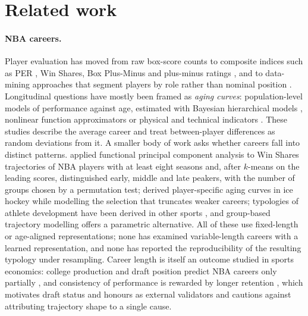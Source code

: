 \section{Related work}\label{sec:related}

\paragraph{NBA careers.} Player evaluation has moved from raw box-score counts to composite indices such as PER \citep{hollinger2002}, Win Shares, Box Plus-Minus and plus-minus ratings \citep{kubatko2007,hvattum2019,deshpande2016}, and to data-mining approaches that segment players by role rather than nominal position \citep{sarlis2020,anilduman2024,pereztoledano2019,radovanovic2013}. Longitudinal questions have mostly been framed as \emph{aging curves}: population-level models of performance against age, estimated with Bayesian hierarchical models \citep{vaci2019}, nonlinear function approximators \citep{xiao2025} or physical and technical indicators \citep{kalen2021}. These studies describe the average career and treat between-player differences as random deviations from it. A smaller body of work asks whether careers fall into distinct patterns. \citet{wakim2014} applied functional principal component analysis to Win Shares trajectories of NBA players with at least eight seasons and, after $k$-means on the leading scores, distinguished early, middle and late peakers, with the number of groups chosen by a permutation test; \citet{elijah2025} derived player-specific aging curves in ice hockey while modelling the selection that truncates weaker careers; typologies of athlete development have been derived in other sports \citep{boccia2017,gulbin2013}, and group-based trajectory modelling \citep{nagin2005} offers a parametric alternative. All of these use fixed-length or age-aligned representations; none has examined variable-length careers with a learned representation, and none has reported the reproducibility of the resulting typology under resampling. Career length is itself an outcome studied in sports economics: college production and draft position predict NBA careers only partially \citep{coates2010,berri2011draft,motomura2016}, and consistency of performance is rewarded by longer retention \citep{deutscher2017}, which motivates draft status and honours as external validators and cautions against attributing trajectory shape to a single cause.

